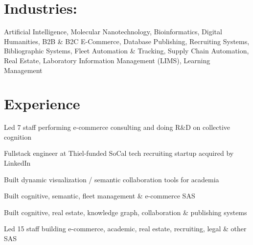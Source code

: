 \documentclass[line,margin,hidelinks]{res}
\begin{document}
\begin{resume}
\section{Industries:}
\begin{par}
Artificial Intelligence,
Molecular Nanotechnology,
Bioinformatics,
Digital Humanities,
B2B \& B2C E-Commerce,
Database Publishing,
Recruiting Systems,
Bibliographic Systems,
Fleet Automation \& Tracking,
Supply Chain Automation,
Real Estate,
Laboratory Information Management (LIMS),
Learning Management
\end{par}


\section{Experience}


\begin{position}
Led 7 staff performing e-commerce consulting and doing R\&D on collective cognition
\end{position}

\parskip=3.5pt %


\begin{position}
Fullstack engineer at Thiel-funded SoCal tech recruiting startup acquired by LinkedIn
\end{position}


\begin{position}
Built dynamic visualization / semantic collaboration tools for academia
\end{position}


\begin{position}
Built cognitive, semantic, fleet management \& e-commerce SAS
\end{position}


\begin{position}
Built cognitive, real estate, knowledge graph, collaboration \& publishing systems
\end{position}


\begin{position}
Led 15 staff building e-commerce, academic, real estate, recruiting, legal \& other SAS
\end{position}


\end{resume}
\end{document}
